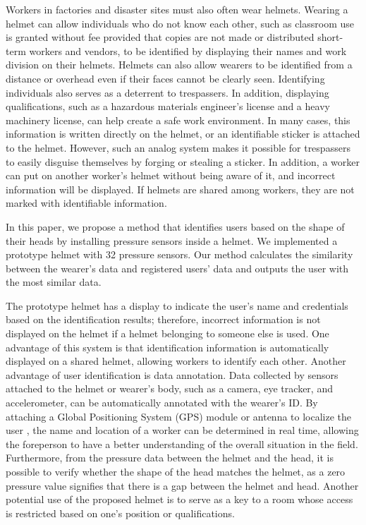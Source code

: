 \documentclass[sigchi,authordraft]{acmart}
\begin{document}
Workers in factories and disaster sites must also often wear helmets. Wearing a helmet can allow individuals who do not know each other, such as classroom use is granted without fee provided that copies are not made or distributed short-term workers and vendors, to be identified by displaying their names and work division on their helmets. Helmets can also allow wearers to be identified from a distance or overhead even if their faces cannot be clearly seen. Identifying individuals also serves as a deterrent to trespassers. In addition, displaying qualifications, such as a hazardous materials engineer's license and a heavy machinery license, can help create a safe work environment. In many cases, this information is written directly on the helmet, or an identifiable sticker is attached to the helmet. However, such an analog system makes it possible for trespassers to easily disguise themselves by forging or stealing a sticker. In addition, a worker can put on another worker's helmet without being aware of it, and incorrect information will be displayed. If helmets are shared among workers, they are not marked with identifiable information.\par

In this paper, we propose a method that identifies users based on the shape of their heads by installing pressure sensors inside a helmet. We implemented a prototype helmet with 32 pressure sensors. Our method calculates the similarity between the wearer's data and registered users' data and outputs the user with the most similar data.\par

The prototype helmet has a display to indicate the user's name and credentials based on the identification results; therefore, incorrect information is not displayed on the helmet if a helmet belonging to someone else is used. One advantage of this system is that identification information is automatically displayed on a shared helmet, allowing workers to identify each other. Another advantage of user identification is data annotation. Data collected by sensors attached to the helmet or wearer's body, such as a camera, eye tracker, and accelerometer, can be automatically annotated with the wearer's ID. By attaching a Global Positioning System (GPS) module or antenna to localize the user \cite{disaster_en}, the name and location of a worker can be determined in real time, allowing the foreperson to have a better understanding of the overall situation in the field. Furthermore, from the pressure data between the helmet and the head, it is possible to verify whether the shape of the head matches the helmet, as a zero pressure value signifies that there is a gap between the helmet and head. Another potential use of the proposed helmet is to serve as a key to a room whose access is restricted based on one's position or qualifications.\par
\end{document}
